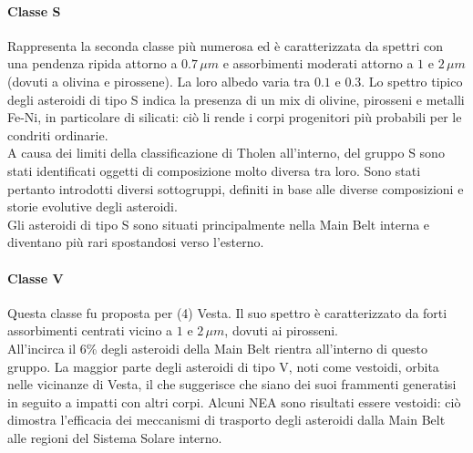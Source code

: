 \documentclass[a4paper,11pt,openright]{book}
\begin{document}
\paragraph*{Classe S}
Rappresenta la seconda classe più numerosa ed è caratterizzata da spettri con una pendenza ripida attorno a $0.7\,\mu m$ e assorbimenti moderati attorno a $1$ e $2\,\mu m$ (dovuti a olivina e pirossene). La loro albedo varia tra $0.1$ e $0.3$. Lo spettro tipico degli asteroidi di tipo S indica la presenza di un mix di olivine, pirosseni e metalli Fe-Ni, in particolare di silicati: ciò li rende i corpi progenitori più probabili per le condriti ordinarie.\\
A causa dei limiti della classificazione di Tholen all’interno, del gruppo S sono stati identificati oggetti di composizione molto diversa tra loro. Sono stati pertanto introdotti diversi sottogruppi, definiti in base alle diverse composizioni e storie evolutive degli asteroidi.\\
Gli asteroidi di tipo S sono situati principalmente nella Main Belt interna e diventano più rari spostandosi verso l'esterno.

\paragraph*{Classe V}
Questa classe fu proposta per (4) Vesta. Il suo spettro è caratterizzato da forti assorbimenti centrati vicino a $1$ e $2\,\mu m$, dovuti ai pirosseni.\\
All'incirca il 6\% degli asteroidi della Main Belt rientra all'interno di questo gruppo. La maggior parte degli asteroidi di tipo V, noti come vestoidi, orbita nelle vicinanze di Vesta, il che suggerisce che siano dei suoi frammenti generatisi in seguito a impatti con altri corpi. Alcuni NEA sono risultati essere vestoidi: ciò dimostra l'efficacia dei meccanismi di trasporto degli asteroidi dalla Main Belt alle regioni del Sistema Solare interno.
\end{document}

